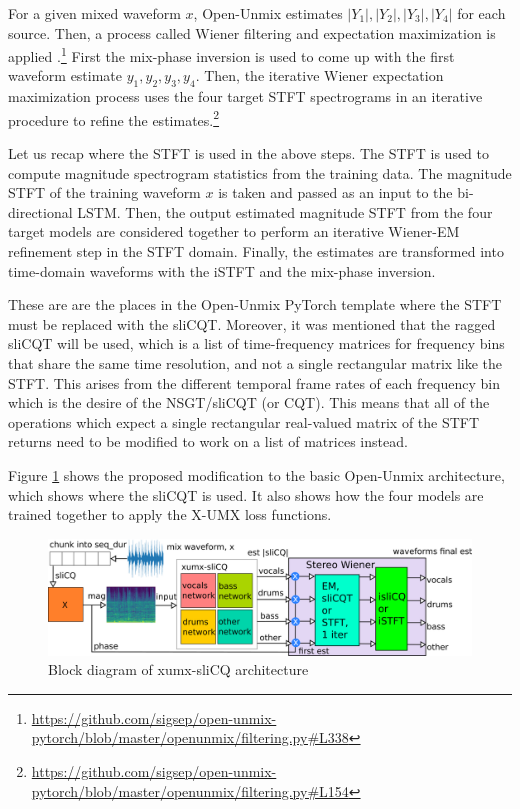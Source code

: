 \documentclass[report.tex]{subfiles}
\begin{document}
\begin{tight_enumerate}
		For a given mixed waveform $x$, Open-Unmix estimates $|Y_{1}|, |Y_{2}|, |Y_{3}|, |Y_{4}|$ for each source. Then, a process called Wiener filtering and expectation maximization is applied \parencite{umxorig1, wiener2, wiener3, wiener4}.\footnote{\url{https://github.com/sigsep/open-unmix-pytorch/blob/master/openunmix/filtering.py\#L338}} First the mix-phase inversion is used to come up with the first waveform estimate $y_{1}, y_{2}, y_{3}, y_{4}$. Then, the iterative Wiener expectation maximization process uses the four target STFT spectrograms in an iterative procedure to refine the estimates.\footnote{\url{https://github.com/sigsep/open-unmix-pytorch/blob/master/openunmix/filtering.py\#L154}}
\end{tight_enumerate}

Let us recap where the STFT is used in the above steps. The STFT is used to compute magnitude spectrogram statistics from the training data. The magnitude STFT of the training waveform $x$ is taken and passed as an input to the bi-directional LSTM. Then, the output estimated magnitude STFT from the four target models are considered together to perform an iterative Wiener-EM refinement step in the STFT domain. Finally, the estimates are transformed into time-domain waveforms with the iSTFT and the mix-phase inversion.

These are are the places in the Open-Unmix PyTorch template where the STFT must be replaced with the sliCQT. Moreover, it was mentioned that the ragged sliCQT will be used, which is a list of time-frequency matrices for frequency bins that share the same time resolution, and not a single rectangular matrix like the STFT. This arises from the different temporal frame rates of each frequency bin which is the desire of the NSGT/sliCQT (or CQT). This means that all of the operations which expect a single rectangular real-valued matrix of the STFT returns need to be modified to work on a list of matrices instead.

Figure \ref{fig:xumxslicq} shows the proposed modification to the basic Open-Unmix architecture, which shows where the sliCQT is used. It also shows how the four models are trained together to apply the X-UMX loss functions.

\begin{figure}[ht]
	\centering
	\includegraphics[width=\textwidth]{./images-blockdiagrams/xumx_slicq_system_compressed_largefont.png}
	\caption{Block diagram of xumx-sliCQ architecture}
	\label{fig:xumxslicq}
\end{figure}
\end{document}
